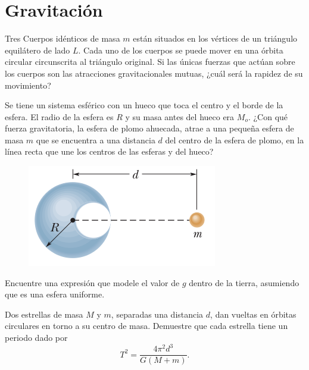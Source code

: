 \section*{Gravitación}

\begin{ejercicio}
	Tres Cuerpos idénticos de masa $m$ están situados en los vértices de un triángulo equilátero de lado $L$. Cada uno de los cuerpos se puede mover en una órbita circular circunscrita al triángulo original. Si las únicas fuerzas que actúan sobre los cuerpos son las atracciones gravitacionales mutuas, ¿cuál será la rapidez de su movimiento?
\end{ejercicio}




\begin{ejercicio}
		Se tiene un sistema esférico con un hueco que toca el centro y el borde de la esfera. El radio de la esfera es $R$ y su masa antes del hueco era $M_o$. ¿Con qué fuerza gravitatoria, la esfera de plomo ahuecada, atrae a una pequeña esfera de masa $m$ que se encuentra a una distancia $d$ del centro de la esfera de plomo, en la línea recta que une los centros de las esferas y del hueco?
		\begin{figure}[H]
			\centering
			\includegraphics[scale=0.5]{./img/p4.png}
			\label{p4}
		\end{figure}
	\end{ejercicio}



\begin{ejercicio}
	Encuentre una expresión que modele el valor de $g$ dentro de la tierra, asumiendo que es una esfera uniforme.
\end{ejercicio}



\begin{ejercicio}
		Dos estrellas de masa $M$ y $m$, separadas una distancia $d$, dan vueltas en órbitas circulares en torno a su centro de masa. Demuestre que cada estrella tiene un periodo dado por
			$$ T^2 = \frac{4\pi ^2 d^3}{G (M + m)}. $$
	\end{ejercicio}



